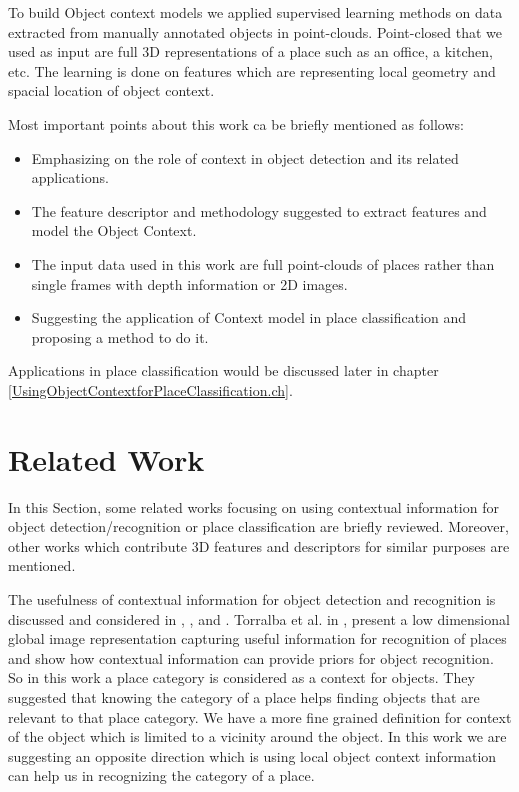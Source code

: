  To build Object context models we applied supervised learning methods on data extracted from manually annotated objects in 
 point-clouds. Point-closed that we used as input are full 3D representations of a place such as an office, a kitchen, etc. 
 The learning  is done on features which are representing local geometry and spacial location of object context.
 
 Most important points about this work ca be briefly mentioned as follows:
 
 \begin{itemize}
  \item Emphasizing on the role of context in object detection and its related applications.
  \item The feature descriptor and methodology suggested to extract features and model the Object Context.
  \item The input data used in this work are full point-clouds of places rather than single frames with depth information or 
  2D images.
  \item Suggesting the application of Context model in place classification and proposing a method to do it.
  
 \end{itemize}

 
Applications in place classification would be discussed later in chapter \ref{UsingObjectContextforPlaceClassification.ch}.

\section {Related Work}
\label{RelatedWork.sec}
     In this Section, some related works focusing on using contextual information for object detection/recognition 
     or place classification are briefly reviewed. 
     Moreover, other works which contribute 3D features and descriptors for similar purposes are mentioned.
     
The usefulness of contextual information for object detection and recognition is discussed and
considered in \cite{TrollbaContexBased}, \cite{TorralbaContextualPriming}, \cite{PerkoLeonardisContextDriven}
and \cite{aydemir2012_3Dcontext}.
Torralba et al. in \cite{TrollbaContexBased}, present a low dimensional global image 
     representation capturing useful information for recognition of places and show how contextual 
     information can provide priors for object recognition.
     So in this work a place category is considered as a context for objects.
     They suggested that knowing the category of a place helps finding objects that are relevant to
     that place category.
     We have a more fine grained definition for context of the object which is limited to a 
     vicinity around the object.
     In this work we are suggesting an opposite direction which is using local object context information
     can help us in recognizing the category of a place.
     
